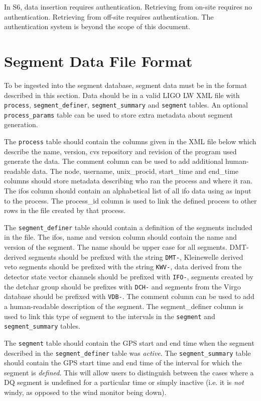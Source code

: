 In S6, data insertion requires authentication. Retrieving from on-site
requires no authentication. Retrieving from off-site requires
authentication.  The authentication system is beyond the scope of this
document.

\section{Segment Data File Format}

To be ingested into the segment database, segment data must be in the
format described in this section. Data should be in a valid LIGO LW
XML file with \verb|process|, \verb|segment_definer|,
\verb|segment_summary| and \verb|segment| tables. An optional
\verb|process_params| table can be used to store extra metadata about
segment generation.

The \verb|process| table should contain the columns given in the XML
file below which describe the name, version, cvs repository and
revision of the program used generate the data. The comment column can
be used to add additional human-readable data. The node, username,
unix\_procid, start\_time and end\_time columns should store metadata
describing who ran the process and where it ran. The ifos column
should contain an alphabetical list of all ifo data using as input to
the process. The process\_id column is used to link the defined
process to other rows in the file created by that process.

The \verb|segment_definer| table should contain a definition of the
segments included in the file. The ifos, name and version column
should contain the name and version of the segment. The name should be
upper case for all segments. DMT-derived segments should be prefixed
with the string \verb|DMT-|, Kleinewelle derived veto segments should
be prefixed with the string \verb|KWV-|, data derived from the
detector state vector channels should be prefixed with \verb|IFO-|,
segments created by the detchar group should be prefixes with
\verb|DCH-| and segments from the Virgo database should be prefixed
with \verb|VDB-|.  The comment column can be used to add a
human-readable description of the segment. The segment\_definer column
is used to link this type of segment to the intervals in the
\verb|segment| and \verb|segment_summary| tables.

The \verb|segment| table should contain the GPS start and end time
when the segment described in the \verb|segment_definer| table was
\emph{active}. The \verb|segment_summary| table should contain the GPS
start time and end time of the interval for which the segment is
\emph{defined}. This will allow users to distinguish between the cases
where a DQ segment is undefined for a particular time or simply
inactive (i.e. it is \emph{not} windy, as opposed to the wind monitor
being down).

